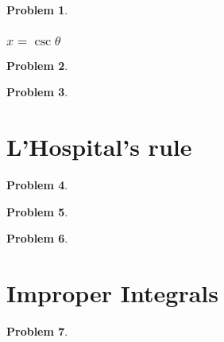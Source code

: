 \documentclass{article}
\newtheorem{problem}{Problem}
\begin{document}
\begin{problem} 

\end{problem} 




\subsubsection{$x=\csc \theta$}
\begin{problem} 

\end{problem} 


\begin{problem} 

\end{problem} 
\section{L'Hospital's rule}

\begin{problem}

\end{problem}

\begin{problem}

\end{problem}


\begin{problem}

\end{problem}
\section{Improper Integrals}
\begin{problem}

\end{problem}

\end{document}
